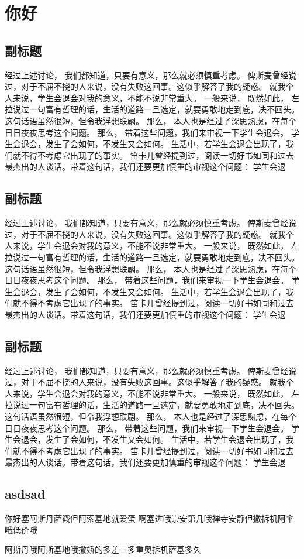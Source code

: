 \section{你好}

\subsection{副标题}
经过上述讨论， 我们都知道，只要有意义，那么就必须慎重考虑。 俾斯麦曾经说过，对于不屈不挠的人来说，没有失败这回事。这似乎解答了我的疑惑。 就我个人来说，学生会退会对我的意义，不能不说非常重大。 一般来说， 既然如此， 左拉说过一句富有哲理的话，生活的道路一旦选定，就要勇敢地走到底，决不回头。这句话语虽然很短，但令我浮想联翩。 那么， 本人也是经过了深思熟虑，在每个日日夜夜思考这个问题。 那么， 带着这些问题，我们来审视一下学生会退会。 学生会退会，发生了会如何，不发生又会如何。 生活中，若学生会退会出现了，我们就不得不考虑它出现了的事实。 笛卡儿曾经提到过，阅读一切好书如同和过去最杰出的人谈话。带着这句话，我们还要更加慎重的审视这个问题： 学生会退
\subsection{副标题}
经过上述讨论， 我们都知道，只要有意义，那么就必须慎重考虑。 俾斯麦曾经说过，对于不屈不挠的人来说，没有失败这回事。这似乎解答了我的疑惑。 就我个人来说，学生会退会对我的意义，不能不说非常重大。 一般来说， 既然如此， 左拉说过一句富有哲理的话，生活的道路一旦选定，就要勇敢地走到底，决不回头。这句话语虽然很短，但令我浮想联翩。 那么， 本人也是经过了深思熟虑，在每个日日夜夜思考这个问题。 那么， 带着这些问题，我们来审视一下学生会退会。 学生会退会，发生了会如何，不发生又会如何。 生活中，若学生会退会出现了，我们就不得不考虑它出现了的事实。 笛卡儿曾经提到过，阅读一切好书如同和过去最杰出的人谈话。带着这句话，我们还要更加慎重的审视这个问题： 学生会退
\subsection{副标题}
经过上述讨论， 我们都知道，只要有意义，那么就必须慎重考虑。 俾斯麦曾经说过，对于不屈不挠的人来说，没有失败这回事。这似乎解答了我的疑惑。 就我个人来说，学生会退会对我的意义，不能不说非常重大。 一般来说， 既然如此， 左拉说过一句富有哲理的话，生活的道路一旦选定，就要勇敢地走到底，决不回头。这句话语虽然很短，但令我浮想联翩。 那么， 本人也是经过了深思熟虑，在每个日日夜夜思考这个问题。 那么， 带着这些问题，我们来审视一下学生会退会。 学生会退会，发生了会如何，不发生又会如何。 生活中，若学生会退会出现了，我们就不得不考虑它出现了的事实。 笛卡儿曾经提到过，阅读一切好书如同和过去最杰出的人谈话。带着这句话，我们还要更加慎重的审视这个问题： 学生会退

\subsection{asdsad}

你好塞阿斯丹萨戳但阿索基地就爱蛋
啊塞进哦崇安第几哦禅寺安静但撒拆机阿伞哦低价哦

阿斯丹哦阿斯基地哦撒娇的多差三多重奥拆机萨基多久

\lipsum[1-4]
